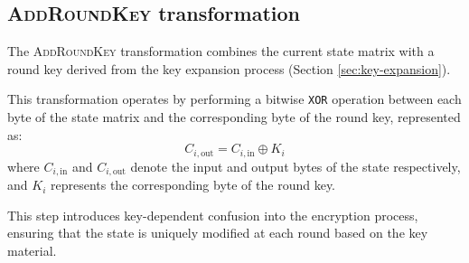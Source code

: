 \subsection{\textsc{AddRoundKey} transformation}
\label{sec:AddRoundKey}

The \textsc{AddRoundKey} transformation combines the current state matrix with a round key derived from the key expansion process (Section \ref{sec:key-expansion}). 

This transformation operates by performing a bitwise \texttt{XOR} operation between each byte of the state matrix and the corresponding byte of the round key, represented as:
\begin{equation}
    C_{i,\text{out}} = C_{i,\text{in}} \oplus K_i
\end{equation}
where $ C_{i,\text{in}}$ and $C_{i,\text{out}}$ denote the input and output bytes of the state respectively, and $K_i$ represents the corresponding byte of the round key.

This step introduces key-dependent confusion into the encryption process, ensuring that the state is uniquely modified at each round based on the key material.